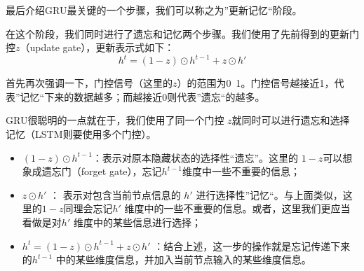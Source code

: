 \documentclass[12pt]{article}
\begin{document}
最后介绍GRU最关键的一个步骤，我们可以称之为”更新记忆“阶段。

在这个阶段，我们同时进行了遗忘和记忆两个步骤。我们使用了先前得到的更新门控$z$（update gate），更新表示式如下：
$$
h^t = (1-z) \odot h^{t-1} + z \odot h'
$$

首先再次强调一下，门控信号（这里的$z$）的范围为0~1。门控信号越接近1，代表”记忆“下来的数据越多；而越接近0则代表”遗忘“的越多。

GRU很聪明的一点就在于，我们使用了同一个门控 $z$就同时可以进行遗忘和选择记忆（LSTM则要使用多个门控）。
\begin{itemize}
\setlength{\itemsep}{0pt}
\setlength{\parsep}{0pt}
\setlength{\parskip}{0pt}
    \item $ (1-z) \odot h^{t-1}$：表示对原本隐藏状态的选择性“遗忘”。这里的 $1-z$可以想象成遗忘门（forget gate），忘记$h^{t-1}$维度中一些不重要的信息；
    \item $z \odot h'$ ： 表示对包含当前节点信息的 $h'$ 进行选择性”记忆“。与上面类似，这里的$1-z$同理会忘记$h'$  维度中的一些不重要的信息。或者，这里我们更应当看做是对$h'$  维度中的某些信息进行选择；
    \item $h^t = (1-z) \odot h^{t-1} + z \odot h'$ ：结合上述，这一步的操作就是忘记传递下来的$h^{t-1}$ 中的某些维度信息，并加入当前节点输入的某些维度信息。
\end{itemize}




\end{document}
